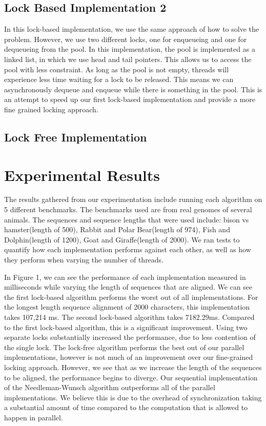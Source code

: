 \documentclass[letterpaper, 10 pt, conference]{IEEEconf}
\begin{document}
\subsection{Lock Based Implementation 2}
In this lock-based implementation, we use the same approach of how to solve the problem. However, we use two different locks, one for enqueueing and one for dequeueing from the pool. In this implementation, the pool is implemented as a linked list, in which we use head and tail pointers. This allows us to access the pool with less constraint. As long as the pool is not empty, threads will experience less time waiting for a lock to be released. This means we can asynchronously dequeue and enqueue while there is something in the pool. 
This is an attempt to speed up our first lock-based implementation and provide a more fine grained locking approach. 
\subsection{Lock Free Implementation}



\section{Experimental Results}
The results gathered from our experimentation include running each algorithm on 5 different benchmarks. The benchmarks used are from real genomes of several animals. The sequences and sequence lengths that were used include: bison vs hamster(length of 500), Rabbit and Polar Bear(length of 974), Fish and Dolphin(length of 1200), Goat and Giraffe(length of 2000). We ran tests to quantify how each implementation performs against each other, as well as how they perform when varying the number of threads. 

In Figure 1, we can see the performance of each implementation measured in milliseconds while varying the length of sequences that are aligned. We can see the first lock-based algorithm performs the worst out of all implementations. For the longest length sequence alignment of 2000 characters, this implementation takes 107,214 ms. The second lock-based algorithm takes 7182.29ms. Compared to the first lock-based algorithm, this is a significant improvement. Using two separate locks substantially increased the performance, due to less contention of the single lock. The lock-free algorithm performs the best out of our parallel implementations, however is not much of an improvement over our fine-grained locking approach. However, we see that as we increase the length of the sequences to be aligned, the performance begins to diverge. Our sequential implementation of the Needleman-Wunsch algorithm outperforms all of the parallel implementations. We believe this is due to the overhead of synchronization taking a substantial amount of time compared to the computation that is allowed to happen in parallel. 
\end{document}
